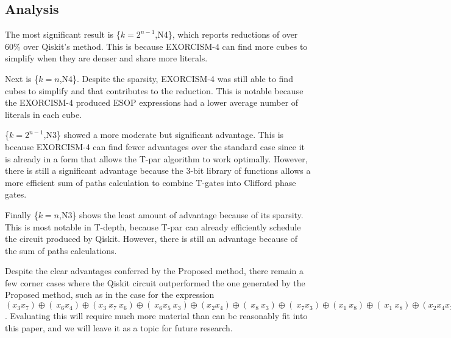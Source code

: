 \subsection{Analysis}
The most significant result is \{$k=2^{n-1}$,N4\}, which reports reductions of over 60\% over
Qiskit's method. This is because EXORCISM-4 can find more cubes to simplify when they are denser
and share more literals.

Next is \{$k=n$,N4\}. Despite the sparsity, EXORCISM-4 was still able to find cubes to simplify
and that contributes to the reduction. This is notable because the EXORCISM-4 produced ESOP
expressions had a lower average number of literals in each cube.

\{$k=2^{n-1}$,N3\} showed a more moderate but significant advantage. This is because EXORCISM-4
can find fewer advantages over the standard case since it is already in a form that allows
the T-par algorithm to work optimally. However, there is still a significant advantage because
the 3-bit library of functions allows a more efficient sum of paths calculation to combine
T-gates into Clifford phase gates.

Finally \{$k=n$,N3\} shows the least amount of advantage because of its sparsity. This is most
notable in T-depth, because T-par can already efficiently schedule the circuit produced by Qiskit.
However, there is still an advantage because of the sum of paths calculations.

Despite the clear advantages conferred by the Proposed method, there remain a few corner
cases where the Qiskit circuit outperformed the one generated by the Proposed method, such as
in the case for the expression $(x_3x_7) \oplus (~x_6x_4) \oplus (x_3~x_7~x_6) \oplus (~x_6x_5~x_3) \oplus (x_2x_4) \oplus (~x_8~x_3) \oplus (~x_7x_3) \oplus (x_1~x_8) \oplus (~x_1~x_8) \oplus (x_2x_4x_3) \oplus (x_3x_5) \oplus (~x_7x_6)$.
Evaluating this will require much more material than can be reasonably fit into this paper,
and we will leave it as a topic for future research.

\label{Exp:An}

